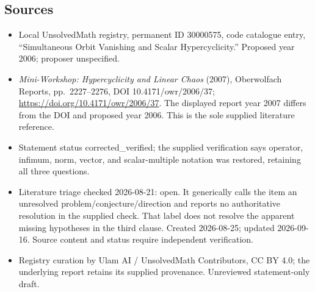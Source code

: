 \documentclass[11pt]{article}
\begin{document}
\subsection{Sources}
\begin{itemize}
\item Local UnsolvedMath registry, permanent ID 30000575, code catalogue entry, ``Simultaneous Orbit Vanishing and Scalar Hypercyclicity.'' Proposed year 2006; proposer unspecified.
\item \emph{Mini-Workshop: Hypercyclicity and Linear Chaos} (2007), Oberwolfach Reports, pp.\ 2227--2276, DOI 10.4171/owr/2006/37; \url{https://doi.org/10.4171/owr/2006/37}. The displayed report year 2007 differs from the DOI and proposed year 2006. This is the sole supplied literature reference.
\item Statement status corrected\_verified; the supplied verification says operator, infimum, norm, vector, and scalar-multiple notation was restored, retaining all three questions.
\item Literature triage checked 2026-08-21: open. It generically calls the item an unresolved problem/conjecture/direction and reports no authoritative resolution in the supplied check. That label does not resolve the apparent missing hypotheses in the third clause. Created 2026-08-25; updated 2026-09-16. Source content and status require independent verification.
\item Registry curation by Ulam AI / UnsolvedMath Contributors, CC BY 4.0; the underlying report retains its supplied provenance. Unreviewed statement-only draft.
\end{itemize}
\end{document}
